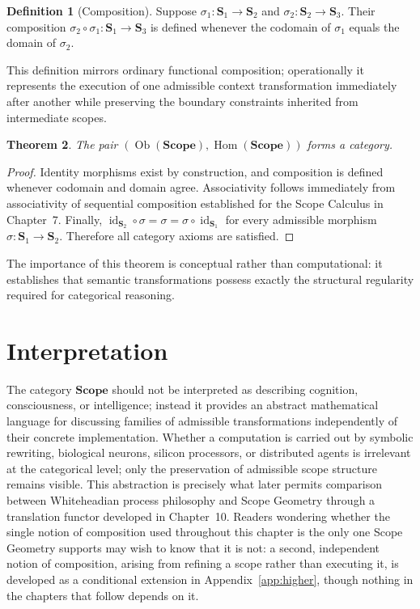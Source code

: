 \documentclass[11pt,twoside,openright]{book}
\numberwithin{equation}{chapter}
\theoremstyle{definition}
\newtheorem{definition}{Definition}[chapter]
\theoremstyle{plain}
\newtheorem{theorem}[definition]{Theorem}
\theoremstyle{remark}
\theoremstyle{definition}
\newcommand{\CatScope}{\mathbf{Scope}}
\newcommand{\Scope}{\mathbf{S}}
\newcommand{\ScopeMorph}{\sigma}
\DeclareMathOperator{\Hom}{Hom}
\DeclareMathOperator{\Obj}{Ob}
\begin{document}
\begin{definition}[Composition]
Suppose $\ScopeMorph_1:\Scope_1\to\Scope_2$ and
$\ScopeMorph_2:\Scope_2\to\Scope_3$. Their composition
$\ScopeMorph_2\circ\ScopeMorph_1:\Scope_1\to\Scope_3$ is defined whenever the
codomain of $\ScopeMorph_1$ equals the domain of $\ScopeMorph_2$.
\end{definition}

This definition mirrors ordinary functional composition; operationally it
represents the execution of one admissible context transformation
immediately after another while preserving the boundary constraints
inherited from intermediate scopes.

\begin{theorem}
The pair $(\Obj(\CatScope),\Hom(\CatScope))$ forms a category.
\end{theorem}

\begin{proof}
Identity morphisms exist by construction, and composition is defined
whenever codomain and domain agree. Associativity follows immediately
from associativity of sequential composition established for the Scope
Calculus in Chapter~7. Finally,
$\operatorname{id}_{\Scope_2}\circ\ScopeMorph=\ScopeMorph=\ScopeMorph\circ\operatorname{id}_{\Scope_1}$
for every admissible morphism $\ScopeMorph:\Scope_1\to\Scope_2$. Therefore all
category axioms are satisfied.
\end{proof}

The importance of this theorem is conceptual rather than computational:
it establishes that semantic transformations possess exactly the
structural regularity required for categorical reasoning.

\section{Interpretation}

The category $\CatScope$ should not be interpreted as describing
cognition, consciousness, or intelligence; instead it provides an
abstract mathematical language for discussing families of admissible
transformations independently of their concrete implementation. Whether a
computation is carried out by symbolic rewriting, biological neurons,
silicon processors, or distributed agents is irrelevant at the
categorical level; only the preservation of admissible scope structure
remains visible. This abstraction is precisely what later permits
comparison between Whiteheadian process philosophy and Scope Geometry
through a translation functor developed in Chapter~10. Readers wondering
whether the single notion of composition used throughout this chapter is
the only one Scope Geometry supports may wish to know that it is not: a
second, independent notion of composition, arising from refining a scope
rather than executing it, is developed as a conditional extension in
Appendix~\ref{app:higher}, though nothing in the chapters that follow
depends on it.
\end{document}
